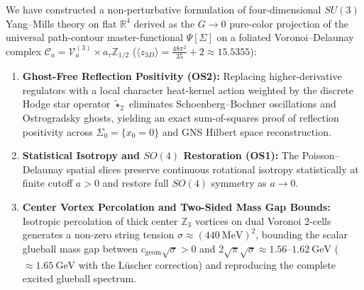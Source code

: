 \documentclass[11pt, a4paper]{article}
\theoremstyle{definition}
\theoremstyle{remark}
\begin{document}
We have constructed a non-perturbative formulation of four-dimensional $SU(3)$ Yang--Mills theory on flat $\mathbb{R}^{4}$ derived as the $G \to 0$ pure-color projection of the universal path-contour master-functional $\Psi[\Sigma]$ on a foliated Voronoi--Delaunay complex $\mathcal{C}_{a} = \mathcal{V}_{a}^{(3)} \times a_{\tau}\mathbb{Z}_{1/2}$ ($\langle z_{3D} \rangle = \frac{48\pi^{2}}{35} + 2 \approx 15.5355$):
\begin{enumerate}
  \item \textbf{Ghost-Free Reflection Positivity (OS2):} Replacing higher-derivative regulators with a local character heat-kernel action weighted by the discrete Hodge star operator $\tilde{\star}_{2}$ eliminates Schoenberg--Bochner oscillations and Ostrogradsky ghosts, yielding an exact sum-of-squares proof of reflection positivity across $\Sigma_{0} = \{x_{0} = 0\}$ and GNS Hilbert space reconstruction.
  \item \textbf{Statistical Isotropy and $SO(4)$ Restoration (OS1):} The Poisson--Delaunay spatial slices preserve continuous rotational isotropy statistically at finite cutoff $a > 0$ and restore full $SO(4)$ symmetry as $a \to 0$.
  \item \textbf{Center Vortex Percolation and Two-Sided Mass Gap Bounds:} Isotropic percolation of thick center $\mathbb{Z}_{3}$ vortices on dual Voronoi 2-cells generates a non-zero string tension $\sigma \approx (440~\mathrm{MeV})^{2}$, bounding the scalar glueball mass gap between $c_{\mathrm{geom}}\sqrt{\sigma} > 0$ and $2\sqrt{\pi}\sqrt{\sigma} \approx 1.56\text{--}1.62~\mathrm{GeV}$ ($\approx 1.65~\mathrm{GeV}$ with the L\"uscher correction) and reproducing the complete excited glueball spectrum.
\end{enumerate}
\end{document}
